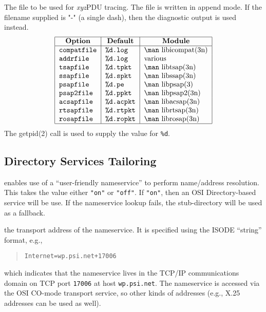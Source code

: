 \begin{describe}
\item[\em xyz\/\verb"file":] The file to be used for {\em xyz\/}PDU tracing.
The file is written in append mode.
If the filename supplied is \arg"-" (a single dash),
then the diagnostic output is used instead.
\[\begin{tabular}{|l|l|l|}
\hline
    \multicolumn{1}{|c|}{\bf Option}&
		\multicolumn{1}{c|}{\bf Default}&
		\multicolumn{1}{c|}{\bf Module}\\
\hline
    \tt compatfile&	\tt \%d.log&	\man libicompat(3n)\\
    \tt addrfile&	\tt \%d.log&	various\\
    \tt tsapfile&	\tt \%d.tpkt&	\man libtsap(3n)\\
    \tt ssapfile&	\tt \%d.spkt&	\man libssap(3n)\\
    \tt psapfile&	\tt \%d.pe&	\man libpsap(3)\\
    \tt psap2file&	\tt \%d.ppkt&	\man libpsap2(3n)\\
    \tt acsapfile&	\tt \%d.acpkt&	\man libacsap(3n)\\
    \tt rtsapfile&	\tt \%d.rtpkt&	\man librtsap(3n)\\
    \tt rosapfile&	\tt \%d.ropkt&	\man librosap(3n)\\
\hline
\end{tabular}\]
The \man getpid(2) call is used to supply the value for \verb"%d".
\end{describe}

\subsection	{Directory Services Tailoring}\label{dse:tailor}
\begin{describe}
\item[\verb"ns\_enable":] enables use of a ``user-friendly nameservice''
to perform name/address resolution.
This takes the value either \verb+"on"+ or \verb+"off"+.
If \verb+"on"+,
then an OSI Directory-based service will be use.
If the nameservice lookup fails,
the stub-directory will be used as a fallback.

\item[\verb"ns\_address":] the transport address of the nameservice.
It is specified using the ISODE ``string'' format,
e.g.,
\begin{quote}\small\begin{verbatim}
Internet=wp.psi.net+17006
\end{verbatim}\end{quote}
which indicates that the nameservice lives in the TCP/IP communications domain
on TCP port \verb"17006" at host \verb"wp.psi.net".
The nameservice is accessed via the OSI CO-mode transport service,
so other kinds of addresses (e.g., X.25 addresses can be used as well).
\end{describe}

